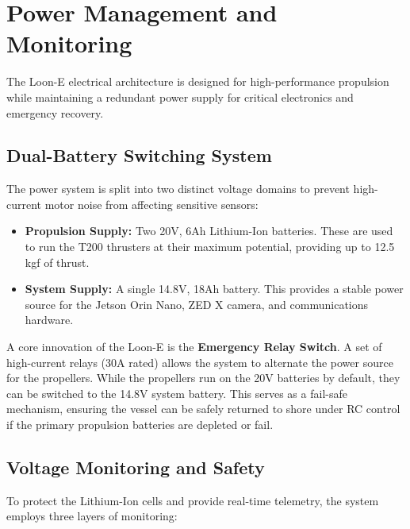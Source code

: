 \section{Power Management and Monitoring}
\label{sec:power-management}

The Loon-E electrical architecture is designed for high-performance propulsion while maintaining a redundant power supply for critical electronics and emergency recovery.

\subsection{Dual-Battery Switching System}
\label{subsec:battery-switching}

The power system is split into two distinct voltage domains to prevent high-current motor noise from affecting sensitive sensors:
\begin{itemize}
    \item \textbf{Propulsion Supply:} Two 20V, 6Ah Lithium-Ion batteries. These are used to run the T200 thrusters at their maximum potential, providing up to 12.5 kgf of thrust.
    \item \textbf{System Supply:} A single 14.8V, 18Ah battery. This provides a stable power source for the Jetson Orin Nano, ZED X camera, and communications hardware.
\end{itemize}

A core innovation of the Loon-E is the \textbf{Emergency Relay Switch}. A set of high-current relays (30A rated) allows the system to alternate the power source for the propellers. While the propellers run on the 20V batteries by default, they can be switched to the 14.8V system battery. This serves as a fail-safe mechanism, ensuring the vessel can be safely returned to shore under RC control if the primary propulsion batteries are depleted or fail.

\subsection{Voltage Monitoring and Safety}
\label{subsec:voltage-monitoring}

To protect the Lithium-Ion cells and provide real-time telemetry, the system employs three layers of monitoring:

